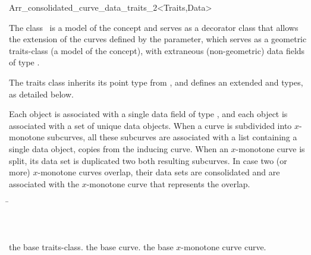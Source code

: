 
\ccRefPageBegin
\begin{ccRefClass}{Arr_consolidated_curve_data_traits_2<Traits,Data>}

\ccDefinition

The class \ccRefName\ is a model of the  concept
and serves as a decorator class that allows the extension of the curves
defined by the  parameter, which serves as a geometric
traits-class (a model of the  concept), with
extraneous (non-geometric) data fields of type .

The traits class inherits its point type from ,
and defines an extended  and  types,
as detailed below.

Each  object is associated with a single data field
of type , and each  object is associated
with a set of unique data objects. When a curve is subdivided into $x$-monotone
subcurves, all these subcurves are associated with a list containing a single
data object, copies from the inducing curve. When an $x$-monotone curve is
split, its data set is duplicated two both resulting subcurves.
In case two (or more) $x$-monotone curves overlap, their data sets are
consolidated and are associated with the $x$-monotone curve that represents
the overlap.

 
\ccIsModel

\ccInheritsFrom
\begin{tabbing}
\=\\
                              \>\\
                              \>\\
                              \>
\end{tabbing}

\ccTypes

    {the base traits-class.}
\ccGlue
{}
    {the base curve.}
\ccGlue
{}
    {the base $x$-monotone curve curve.}


\end{ccRefClass}

